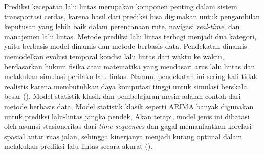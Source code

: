 Prediksi kecepatan lalu lintas merupakan komponen penting dalam sistem transportasi cerdas, karena hasil dari prediksi bisa digunakan untuk pengambilan keputusan yang lebih baik dalam perencanaan rute, navigasi \textit{real-time}, dan manajemen lalu lintas. Metode prediksi lalu lintas terbagi menjadi dua kategori, yaitu berbasis model dinamis dan metode berbasis data. Pendekatan dinamis memodelkan evolusi temporal kondisi lalu lintas dari waktu ke waktu, berdasarkan hukum fisika atau matematika yang mendasari arus lalu lintas dan melakukan simulasi perilaku lalu lintas. Namun, pendekatan ini sering kali tidak realistis karena membutuhkan daya komputasi tinggi untuk simulasi berskala besar (\cite{Vlahogianni2015}). Model statistik klasik dan pembelajaran mesin adalah contoh dari metode berbasis data. Model statistik klasik seperti ARIMA banyak digunakan untuk prediksi lalu-lintas jangka pendek, Akan tetapi, model jenis ini dibatasi oleh asumsi stasioneritas dari \textit{time sequences} dan gagal memanfaatkan korelasi spasial antar ruas jalan, sehingga kinerjanya menjadi kurang optimal dalam melakukan prediksi lalu lintas secara akurat (\cite{AhmedCook1979}).

